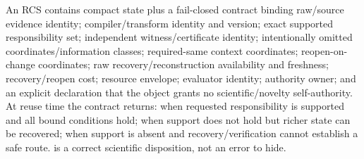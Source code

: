 \markdownRendererDocumentBegin
\markdownRendererSectionBegin
{}\markdownRendererInterblockSeparator
{}An RCS contains compact state plus a fail-closed contract binding raw/source evidence identity; compiler/transform identity and version; exact supported responsibility set; independent witness/certificate identity; intentionally omitted coordinates/information classes; required-same context coordinates; reopen-on-change coordinates; raw recovery/reconstruction availability and freshness; recovery/reopen cost; resource envelope; evaluator identity; authority owner; and an explicit declaration that the object grants no scientific/novelty self-authority.\markdownRendererInterblockSeparator
{}At reuse time the contract returns:\markdownRendererInterblockSeparator
{}\markdownRendererUlBeginTight
\markdownRendererUlItem {} when requested responsibility is supported and all bound conditions hold;\markdownRendererUlItemEnd 
\markdownRendererUlItem {} when support does not hold but richer state can be recovered;\markdownRendererUlItemEnd 
\markdownRendererUlItem {} when support is absent and recovery/verification cannot establish a safe route.\markdownRendererUlItemEnd 
\markdownRendererUlEndTight \markdownRendererInterblockSeparator
{} is a correct scientific disposition, not an error to hide.
\markdownRendererSectionEnd \markdownRendererDocumentEnd